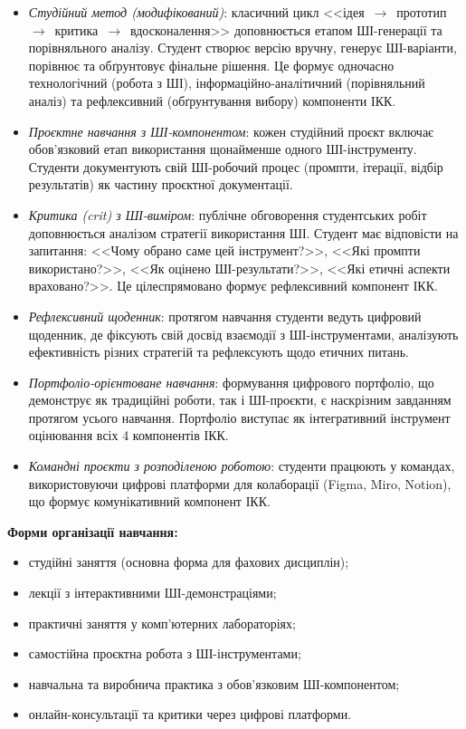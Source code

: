 \begin{itemize}
    \item \textit{Студійний метод (модифікований)}: класичний цикл <<ідея~$\to$~прототип~$\to$~критика~$\to$~вдосконалення>> доповнюється етапом ШІ-генерації та порівняльного аналізу. Студент створює версію вручну, генерує ШІ-варіанти, порівнює та обґрунтовує фінальне рішення. Це формує одночасно технологічний (робота з ШІ), інформаційно-аналітичний (порівняльний аналіз) та рефлексивний (обґрунтування вибору) компоненти ІКК.

    \item \textit{Проєктне навчання з ШІ-компонентом}: кожен студійний проєкт включає обов'язковий етап використання щонайменше одного ШІ-інструменту. Студенти документують свій ШІ-робочий процес (промпти, ітерації, відбір результатів) як частину проєктної документації.

    \item \textit{Критика (crit) з ШІ-виміром}: публічне обговорення студентських робіт доповнюється аналізом стратегії використання ШІ. Студент має відповісти на запитання: <<Чому обрано саме цей інструмент?>>, <<Які промпти використано?>>, <<Як оцінено ШІ-результати?>>, <<Які етичні аспекти враховано?>>. Це цілеспрямовано формує рефлексивний компонент ІКК.

    \item \textit{Рефлексивний щоденник}: протягом навчання студенти ведуть цифровий щоденник, де фіксують свій досвід взаємодії з ШІ-інструментами, аналізують ефективність різних стратегій та рефлексують щодо етичних питань.

    \item \textit{Портфоліо-орієнтоване навчання}: формування цифрового портфоліо, що демонструє як традиційні роботи, так і ШІ-проєкти, є наскрізним завданням протягом усього навчання. Портфоліо виступає як інтегративний інструмент оцінювання всіх 4 компонентів ІКК.

    \item \textit{Командні проєкти з розподіленою роботою}: студенти працюють у командах, використовуючи цифрові платформи для колаборації (Figma, Miro, Notion), що формує комунікативний компонент ІКК.
\end{itemize}

\textbf{Форми організації навчання:}
\begin{itemize}
    \item студійні заняття (основна форма для фахових дисциплін);
    \item лекції з інтерактивними ШІ-демонстраціями;
    \item практичні заняття у комп'ютерних лабораторіях;
    \item самостійна проєктна робота з ШІ-інструментами;
    \item навчальна та виробнича практика з обов'язковим ШІ-компонентом;
    \item онлайн-консультації та критики через цифрові платформи.
\end{itemize}

